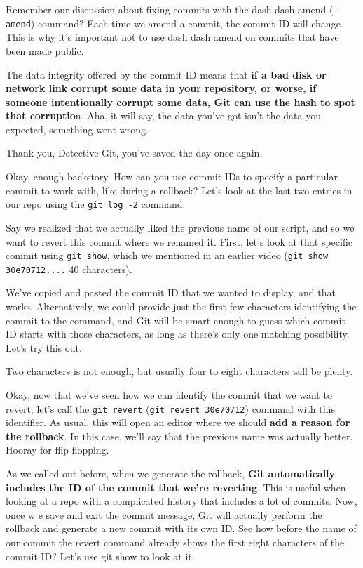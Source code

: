 	Remember our discussion about fixing commits with the dash dash amend (\verb|--amend|) command? Each time we amend a commit, the commit ID will change. This is why it's important not to use dash dash amend on commits that have been made public.
	
	The data integrity offered by the commit ID means that \textbf{if a bad disk or network link corrupt some data in your repository, or worse, if someone intentionally corrupt some data, Git can use the hash to spot that corruptio}n. Aha, it will say, the data you've got isn't the data you expected, something went wrong.
	
	Thank you, Detective Git, you've saved the day once again.
	
	Okay, enough backstory. How can you use commit IDs to specify a particular commit to work with, like during a rollback? Let's look at the last two entries in our repo using the \verb|git log -2| command.
	
	Say we realized that we actually liked the previous name of our script, and so we want to revert this commit where we renamed it. First, let's look at that specific commit using \texttt{git show}, which we mentioned in an earlier video (\texttt{git show 30e70712....} 40 characters).
	
	We've copied and pasted the commit ID that we wanted to display, and that works. Alternatively, we could provide just the first few characters identifying the commit to the command, and Git will be smart enough to guess which commit ID starts with those characters, as long as there's only one matching possibility. Let's try this out.
	
	Two characters is not enough, but usually four to eight characters will be plenty.
	
	Okay, now that we've seen how we can identify the commit that we want to revert, let's call the \texttt{git revert} (\texttt{git revert 30e70712}) command with this identifier. As usual, this will open an editor where we should \textbf{add a reason for the rollback}. In this case, we'll say that the previous name was actually better. Hooray for flip-flopping.
	
	As we called out before, when we generate the rollback,\textbf{ Git automatically includes the ID of the commit that we're reverting}. This is useful when looking at a repo with a complicated history that includes a lot of commits. Now, once w e save and exit the commit message, Git will actually perform the rollback and generate a new commit with its own ID. See how before the name of our commit the revert command already shows the first eight characters of the commit ID? Let's use git show to look at it.
	
